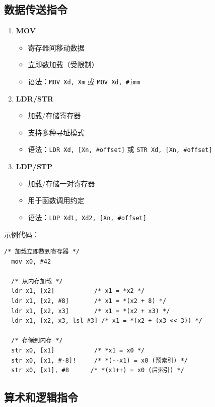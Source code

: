 \subsection{数据传送指令}


\begin{enumerate}
  \item \textbf{MOV}
    \begin{itemize}
      \item 寄存器间移动数据
      \item 立即数加载（受限制）
      \item 语法：\texttt{MOV Xd, Xm} 或 \texttt{MOV Xd, \#imm}
    \end{itemize}

  \item \textbf{LDR/STR}
    \begin{itemize}
      \item 加载/存储寄存器
      \item 支持多种寻址模式
      \item 语法：\texttt{LDR Xd, [Xn, \#offset]} 或 \texttt{STR Xd, [Xn, \#offset]}
    \end{itemize}

  \item \textbf{LDP/STP}
    \begin{itemize}
      \item 加载/存储一对寄存器
      \item 用于函数调用约定
      \item 语法：\texttt{LDP Xd1, Xd2, [Xn, \#offset]}
    \end{itemize}
\end{enumerate}

示例代码：
\begin{lstlisting}[language={[ARM]Assembler}]
  /* 加载立即数到寄存器 */
  mov x0, #42

  /* 从内存加载 */
  ldr x1, [x2]           /* x1 = *x2 */
  ldr x1, [x2, #8]       /* x1 = *(x2 + 8) */
  ldr x1, [x2, x3]       /* x1 = *(x2 + x3) */
  ldr x1, [x2, x3, lsl #3] /* x1 = *(x2 + (x3 << 3)) */

  /* 存储到内存 */
  str x0, [x1]           /* *x1 = x0 */
  str x0, [x1, #-8]!     /* *(--x1) = x0 (预索引) */
  str x0, [x1], #8      /* *(x1++) = x0 (后索引) */
\end{lstlisting}

\subsection{算术和逻辑指令}

